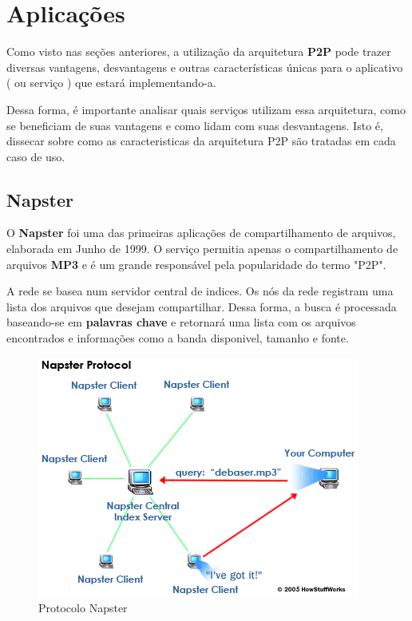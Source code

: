 \documentclass[a4paper]{article}
\begin{document}
\newpage

\section{Aplicações}
Como visto nas seções anteriores, a utilização da arquitetura \textbf{P2P} pode trazer diversas vantagens, desvantagens e outras características únicas para o aplicativo ( ou serviço ) que estará implementando-a. 

Dessa forma, é importante analisar quais serviços utilizam essa arquitetura, como se beneficiam de suas vantagens e como lidam com suas desvantagens. Isto é, dissecar sobre como as caracteristicas da arquitetura P2P são tratadas em cada caso de uso.
\subsection{Napster}
O \textbf{Napster} foi uma das primeiras aplicações de compartilhamento de arquivos, elaborada em Junho de 1999. O serviço permitia apenas o compartilhamento de arquivos \textbf{MP3} e é um grande responsável pela popularidade do termo "P2P".

A rede se basea num servidor central de indices. Os nós da rede registram uma lista dos arquivos que desejam compartilhar. Dessa forma, a busca é processada baseando-se em \textbf{palavras chave} e retornará uma lista com os arquivos encontrados e informações como a banda disponivel, tamanho e fonte. 

\begin{figure}[!h]
\begin{center}
  \includegraphics{img//ilustracaoiot.png} 
  \caption{Protocolo Napster \cite{howstuffworks} \label{figure1}}
\end{center}
\end{figure}
\end{document}

